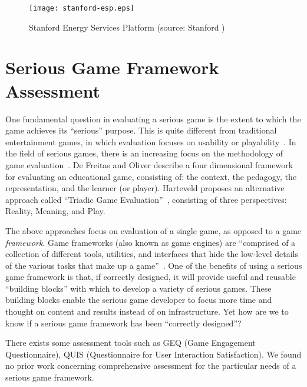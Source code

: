 \begin{figure}[htbp]
	\centering
		\texttt{[image: stanford-esp.eps]}
		\caption{Stanford Energy Services Platform (source: Stanford \cite{Armel-2012})}
		\label{fig:building-dashboard}
\end{figure}

\section{Serious Game Framework Assessment}

One fundamental question in evaluating a serious game is the extent to which the
game achieves its ``serious'' purpose.  This is quite different from 
traditional entertainment games, in which evaluation focuses on usability or
playability~\cite{song2007new}. In the field of serious games, there is an increasing
focus on the methodology of game evaluation~\cite{Mayer2012233}. De Freitas and
Oliver describe a four dimensional framework~\cite{de2006can} for evaluating an
educational game, consisting of: the context, the pedagogy, the representation, and the
learner (or player). Harteveld proposes an alternative approach called ``Triadic Game
Evaluation''~\cite{harteveld2010triadic}, consisting of three perspectives: Reality,
Meaning, and Play.

The above approaches focus on evaluation of a single game, as opposed to a game {\em
  framework}. Game frameworks (also known as game engines) are ``comprised of a collection
of different tools, utilities, and interfaces that hide the low-level details of the
various tasks that make up a game''~\cite{sherrod2006ultimate}. One of the benefits of
using a serious game framework is that, if correctly designed, it will provide useful and
reusable ``building blocks'' with which to develop a variety of serious games.  These
building blocks enable the serious game developer to focus more time and thought on
content and results instead of on infrastructure. Yet how are we to know if a serious
game framework has been ``correctly designed''?

There exists some assessment tools such as GEQ (Game Engagement Questionnaire)\cite{brockmyer2009development}, QUIS (Questionnaire for User Interaction Satisfaction)\cite{harper1993improving}. We found no prior work concerning comprehensive assessment for 
the particular needs of a serious game framework. 